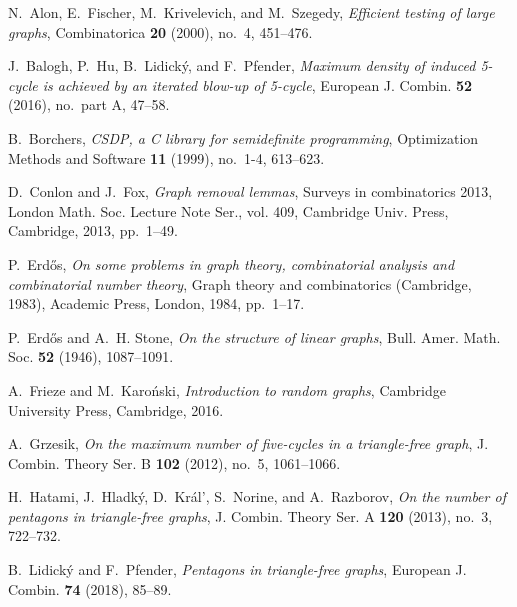 \documentclass[12pt]{article}
\def\MR#1{}
\theoremstyle{definition}
\theoremstyle{remark}
\begin{document}
\providecommand{\bysame}{\leavevmode\hbox to3em{\hrulefill}\thinspace}
\providecommand{\MR}{\relax\ifhmode\unskip\space\fi MR }
\providecommand{\MRhref}[2]{%
  \href{http://www.ams.org/mathscinet-getitem?mr=#1}{#2}
}
\providecommand{\href}[2]{#2}
\begin{thebibliography}{10}

N.~Alon, E.~Fischer, M.~Krivelevich, and M.~Szegedy, \emph{Efficient testing of
  large graphs}, Combinatorica \textbf{20} (2000), no.~4, 451--476.

J.~Balogh, P.~Hu, B.~Lidick\'y, and F.~Pfender, \emph{Maximum density of
  induced 5-cycle is achieved by an iterated blow-up of 5-cycle}, European J.
  Combin. \textbf{52} (2016), no.~part A, 47--58. \MR{3425964}

B.~Borchers, \emph{{CSDP}, a {C} library for semidefinite programming},
  Optimization Methods and Software \textbf{11} (1999), no.~1-4, 613--623.

D.~Conlon and J.~Fox, \emph{Graph removal lemmas}, Surveys in combinatorics
  2013, London Math. Soc. Lecture Note Ser., vol. 409, Cambridge Univ. Press,
  Cambridge, 2013, pp.~1--49. \MR{3156927}

P.~Erd{\H o}s, \emph{On some problems in graph theory, combinatorial analysis
  and combinatorial number theory}, Graph theory and combinatorics
  ({C}ambridge, 1983), Academic Press, London, 1984, pp.~1--17. \MR{777160}

P.~Erd{\H o}s and A.~H. Stone, \emph{On the structure of linear graphs}, Bull.
  Amer. Math. Soc. \textbf{52} (1946), 1087--1091. \MR{0018807}

A.~Frieze and M.~Karo\'nski, \emph{Introduction to random graphs}, Cambridge
  University Press, Cambridge, 2016. \MR{3675279}

A.~Grzesik, \emph{On the maximum number of five-cycles in a triangle-free
  graph}, J. Combin. Theory Ser. B \textbf{102} (2012), no.~5, 1061--1066.
  \MR{2959390}

H.~Hatami, J.~Hladk\'y, D.~Kr{\'al'}, S.~Norine, and A.~Razborov, \emph{On the
  number of pentagons in triangle-free graphs}, J. Combin. Theory Ser. A
  \textbf{120} (2013), no.~3, 722--732. \MR{3007147}

B.~Lidick\'y and F.~Pfender, \emph{Pentagons in triangle-free graphs}, European
  J. Combin. \textbf{74} (2018), 85--89.


\end{thebibliography}
\end{document}
